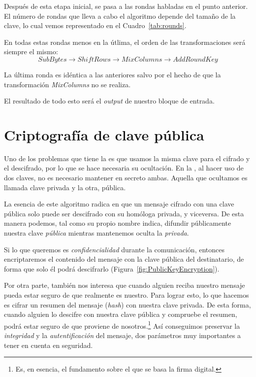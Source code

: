  Después de esta etapa inicial, se pasa a las rondas habladas en el punto anterior.
 El número de rondas que lleva a cabo el algoritmo depende del tamaño de la clave,
 lo cual vemos representado en el Cuadro~\ref{tab:rounds}.

 En todas estas rondas menos en la útlima, el orden de las transformaciones será siempre el mismo:
 \[ SubBytes \rightarrow ShiftRows \rightarrow MixColumns \rightarrow AddRoundKey \]

 La última ronda es idéntica a las anteriores salvo por el hecho de que la transformación \emph{MixColumns} no se realiza.

 El resultado de todo esto será el \emph{output} de nuestro bloque de entrada. \emph{\parencite{Reference26}}


 \section{Criptografía de clave pública}

 Uno de los problemas que tiene la  es que usamos la misma clave para el cifrado y el descifrado, por lo que se hace necesaria su ocultación.
 En la , al hacer uso de dos claves, no es necesario mantener en secreto ambas. Aquella que ocultamos es llamada clave privada y la otra, pública.

 La esencia de este algoritmo radica en que un mensaje cifrado con una clave pública solo puede ser descifrado con su homóloga privada, y viceversa.
 De esta manera podemos, tal como su propio nombre indica, difundir públicamente nuestra clave \emph{pública} mientras mantenemos oculta la \emph{privada}.

 Si lo que queremos es \emph{confidencialidad} durante la comunicación, entonces encriptaremos el contenido del mensaje con la clave pública del destinatario, de forma que solo él podrá descifrarlo (Figura~\ref{fig:PublicKeyEncryption}).

 Por otra parte, también nos interesa que cuando alguien reciba nuestro mensaje pueda estar seguro de que realmente es nuestro.
 Para lograr esto, lo que hacemos es cifrar un resumen del mensaje (\emph{hash}) con nuestra clave privada.
 De esta forma, cuando alguien lo descifre con nuestra clave pública y compruebe el resumen, podrá estar seguro de que proviene de nosotros.\footnote{Es, en esencia, el fundamento sobre el que se basa la firma digital.}
 Así conseguimos preservar la \emph{integridad} y la \emph{autentificación} del mensaje, dos parámetros muy importantes a tener en cuenta en seguridad. \emph{\parencite{Reference14}}

